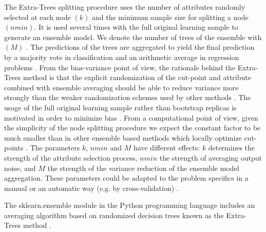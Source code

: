 \documentclass[]{llncs} %
\begin{document}
The Extra-Trees splitting procedure uses the number of attributes randomly selected at each node $(k)$ and the minimum sample size for splitting a node $(nmin)$. It is used several times with the full original learning sample to generate an ensemble model. We denote the number of trees of the ensemble with $(M)$  \cite{ExtremeRandomTrees}. The predictions of the trees are aggregated to yield the final prediction by a majority vote in classification and an arithmetic average in regression problems \cite{ExtremeRandomTrees}. From the bias-variance point of view, the rationale behind the Extra-Trees method is that the explicit randomization of the cut-point and attribute combined with ensemble averaging should be able to reduce variance more strongly than the weaker randomization schemes used by other methods \cite{ExtremeRandomTrees}. The usage of the full original learning sample rather than bootstrap replicas is motivated in order to minimize bias \cite{ExtremeRandomTrees}. From a computational point of view, given the simplicity of the node splitting procedure we expect the constant factor to be much smaller than in other ensemble based methods which locally optimize cut-points \cite{ExtremeRandomTrees}. The parameters $k$, $nmin$ and $M$ have different effects: $k$ determines the strength of the attribute selection process, $nmin$ the strength of averaging output noise, and $M$ the strength of the variance reduction of the ensemble model aggregation. These parameters could be adapted to the problem specifics in a manual or an automatic way (e.g. by cross-validation) \cite{ExtremeRandomTrees}. \par

The sklearn.ensemble module in the Python programming language includes an averaging algorithm based on randomized decision trees known as the Extra-Trees method \cite{scikit-learn}.\par
\end{document}
